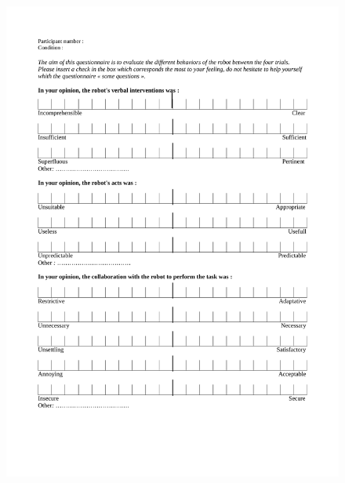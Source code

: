 \begin{figure}[!h]
	\centering
    \includegraphics[width=\textwidth]{figs/Chapter5/Questionnaire_english1.pdf}
    \caption{}
    \label{fig:Questionnaire_english}
\end{figure}

